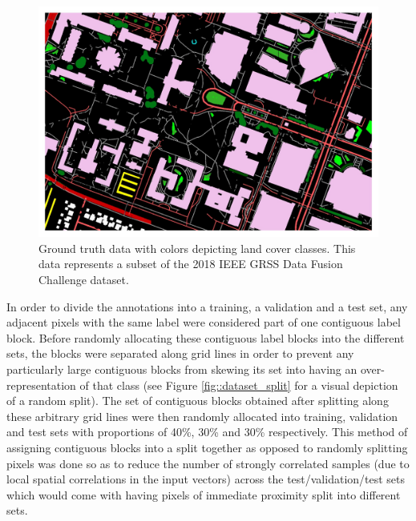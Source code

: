 \documentclass[
twocolumn,
]{ceurart}
\begin{document}

\begin{figure}[!t]
\centering
\includegraphics[width=.7\columnwidth]{figures/gt.jpg}
\caption{Ground truth data with colors depicting land cover classes. This data represents a subset of the 2018 IEEE GRSS Data Fusion Challenge dataset.}
\label{fig::gt}
\end{figure}

In order to divide the annotations into a training, a validation and a test set, any adjacent pixels with the same label were considered part of one contiguous label block.
Before randomly allocating these contiguous label blocks into the different sets, the blocks were separated along grid lines in order to prevent any particularly large contiguous blocks from skewing its set into having an over-representation of that class (see Figure \ref{fig::dataset_split} for a visual depiction of a random split).
The set of contiguous blocks obtained after splitting along these arbitrary grid lines were then randomly allocated into training, validation and test sets with proportions of 40\%, 30\% and 30\% respectively.
This method of assigning contiguous blocks into a split together as opposed to randomly splitting pixels was done so as to reduce the number of strongly correlated samples (due to local spatial correlations in the input vectors) across the test/validation/test sets which would come with having pixels of immediate proximity split into different sets.
\end{document}
